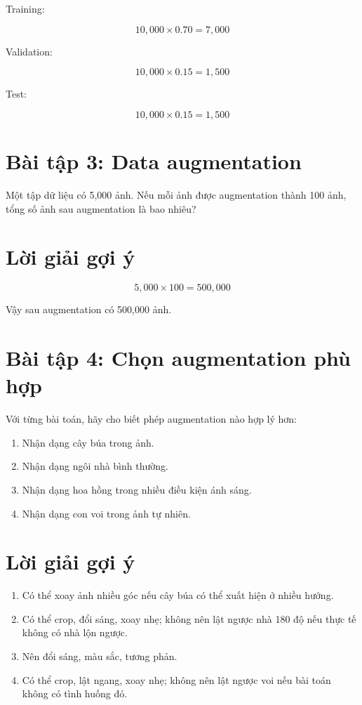 \documentclass[12pt,a4paper]{report}
\begin{document}
Training:

\[
    10,000 \times 0.70 = 7,000
\]

Validation:

\[
    10,000 \times 0.15 = 1,500
\]

Test:

\[
    10,000 \times 0.15 = 1,500
\]

\section*{Bài tập 3: Data augmentation}

Một tập dữ liệu có 5,000 ảnh. Nếu mỗi ảnh được augmentation thành 100 ảnh, tổng số ảnh sau augmentation là bao nhiêu?

\section*{Lời giải gợi ý}

\[
    5,000 \times 100 = 500,000
\]

Vậy sau augmentation có 500,000 ảnh.

\section*{Bài tập 4: Chọn augmentation phù hợp}

Với từng bài toán, hãy cho biết phép augmentation nào hợp lý hơn:

\begin{enumerate}
    \item Nhận dạng cây búa trong ảnh.
    \item Nhận dạng ngôi nhà bình thường.
    \item Nhận dạng hoa hồng trong nhiều điều kiện ánh sáng.
    \item Nhận dạng con voi trong ảnh tự nhiên.
\end{enumerate}

\section*{Lời giải gợi ý}

\begin{enumerate}
    \item Có thể xoay ảnh nhiều góc nếu cây búa có thể xuất hiện ở nhiều hướng.
    \item Có thể crop, đổi sáng, xoay nhẹ; không nên lật ngược nhà 180 độ nếu thực tế không có nhà lộn ngược.
    \item Nên đổi sáng, màu sắc, tương phản.
    \item Có thể crop, lật ngang, xoay nhẹ; không nên lật ngược voi nếu bài toán không có tình huống đó.
\end{enumerate}
\end{document}
